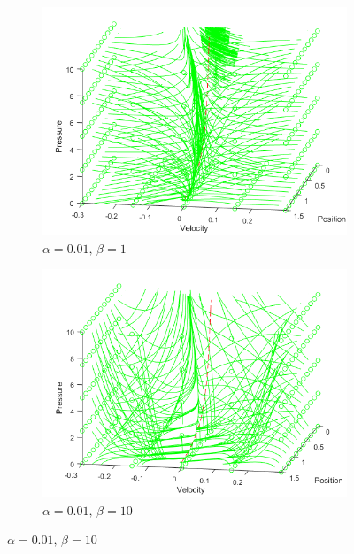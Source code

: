 \begin{figure}[ht]
    \centering
    \begin{subfigure}{0.49\textwidth}
    \includegraphics[width=\textwidth]{Figures/LowFlow/3DPhase-b=1.png}
    \caption{$\alpha = 0.01, \, \beta = 1$}
    \end{subfigure}
    \begin{subfigure}{0.49\textwidth}
    \includegraphics[width=\textwidth]{Figures/LowFlow/3DPhase-b=10.png}
    \caption{$\alpha = 0.01, \, \beta = 10$}
    \end{subfigure}
\end{figure}



